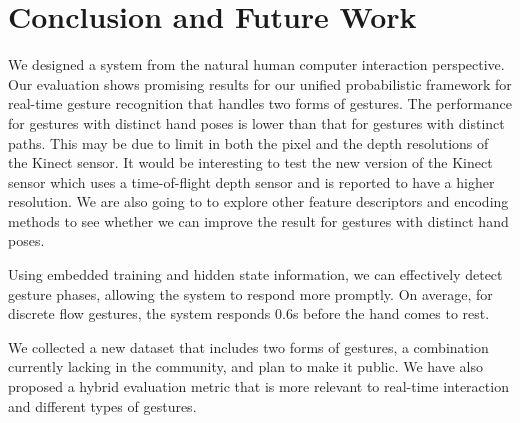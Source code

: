 \documentclass[conference]{IEEEtran}
\begin{document}
\section{Conclusion and Future Work}
We designed a system from the natural human computer interaction perspective.
Our evaluation shows promising results for our unified probabilistic framework
for real-time gesture recognition that handles two forms of gestures.
The performance for gestures with distinct hand poses is lower than that for
gestures with distinct paths. This may be due to limit in
both the pixel and the depth resolutions of the Kinect sensor. It would be interesting to test
the new version of the Kinect sensor which uses a time-of-flight depth sensor
and is reported to have a higher resolution. We are also going to to explore
other feature descriptors and encoding methods to see whether we can
improve the result for gestures with distinct hand poses.

Using embedded training and hidden state information, we can effectively
detect gesture phases, allowing the system to respond more promptly. On average,
for discrete flow gestures, the system responds 0.6s before the hand comes to
rest. 

We collected a new dataset that includes two forms of gestures, a
combination currently lacking in the community, and plan to make it
public. We have also proposed a hybrid evaluation metric
that is more relevant to real-time interaction and different types of gestures.
 





%
% 
% 




\end{document}
